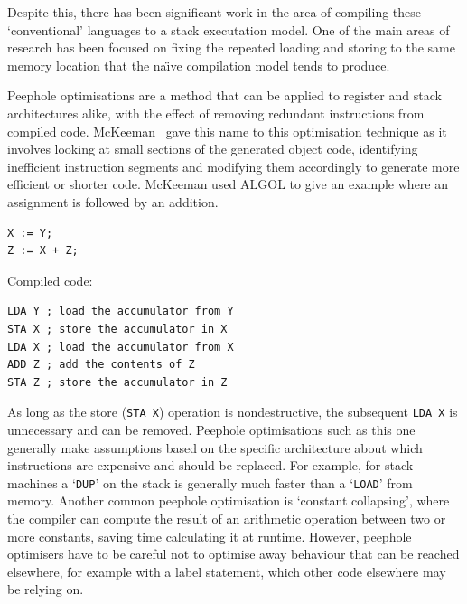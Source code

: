 Despite this, there has been significant work in the area of compiling these
`conventional' languages to a stack executation model. One of the main areas of
research has been focused on fixing the repeated loading and storing to the same
memory location that the na{\"\i}ve compilation model tends to produce.

Peephole optimisations are a method that can be applied to register and stack
architectures alike, with the effect of removing redundant instructions from
compiled code. McKeeman~\cite{McKeeman1965Peephole} gave this name to this
optimisation technique as it involves looking at small sections of the generated
object code, identifying inefficient instruction segments and modifying them
accordingly to generate more efficient or shorter code. McKeeman used ALGOL to
give an example where an assignment is followed by an addition.

\vspace{2ex}

\begin{minipage}{.25\textwidth}
  \centering
  \begin{lstlisting}[language=Algol]
X := Y;
Z := X + Z;
  \end{lstlisting}
\end{minipage}%
\begin{minipage}{.55\textwidth}
  Compiled code:
  \begin{lstlisting}
LDA Y ; load the accumulator from Y
STA X ; store the accumulator in X
LDA X ; load the accumulator from X
ADD Z ; add the contents of Z
STA Z ; store the accumulator in Z
  \end{lstlisting}
\end{minipage}

As long as the store (\lstinline{STA X}) operation is nondestructive, the
subsequent \lstinline{LDA X} is unnecessary and can be removed. Peephole
optimisations such as this one generally make assumptions based on the specific
architecture about which
instructions are expensive and should be replaced. For example, for
stack machines a `\texttt{DUP}' on the stack is generally much faster than a
`\texttt{LOAD}' from memory. Another common peephole optimisation is `constant
collapsing', where the compiler can compute the result of an arithmetic
operation between two or more constants, saving time calculating it at runtime.
However, peephole optimisers have to be careful not to optimise away behaviour
that can be reached elsewhere, for example with a label statement, which other
code elsewhere may be relying on.

